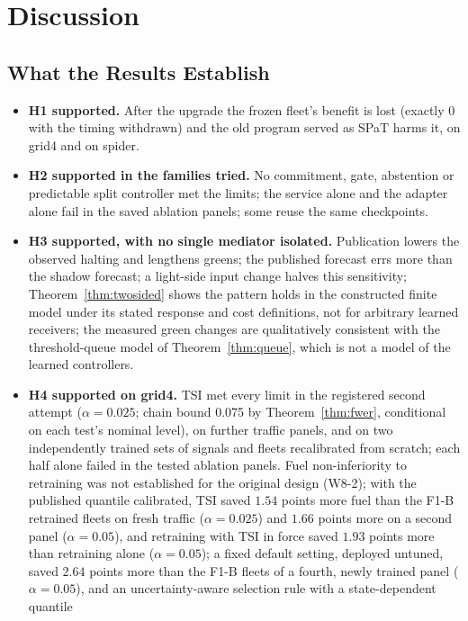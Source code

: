 \section{Discussion}\label{sec:discussion}
\subsection{What the Results Establish}
\begin{itemize}\setlength\itemsep{1pt}
\item \textbf{H1 supported.} After the upgrade the frozen fleet's benefit is lost (exactly 0 with the timing withdrawn) and the old program
served as SPaT harms it, on grid4 and on spider.
\item \textbf{H2 supported in the families tried.} No commitment, gate, abstention or predictable split controller met the limits; the
service alone and the adapter alone fail in the saved ablation panels; some reuse the same checkpoints.
\item \textbf{H3 supported, with no single mediator isolated.} Publication lowers the observed halting and lengthens greens; the published
forecast errs more than the shadow forecast; a light-side input change halves this sensitivity; Theorem~\ref{thm:twosided} shows the
pattern holds in the constructed finite model under its stated response and cost definitions, not for arbitrary learned receivers; the measured green changes are qualitatively consistent with the threshold-queue model of
Theorem~\ref{thm:queue}, which is not a model of the learned controllers.
\item \textbf{H4 supported on grid4.} TSI met every limit in the registered second attempt ($\alpha=0.025$; chain bound 0.075 by
Theorem~\ref{thm:fwer}, conditional on each test's nominal level), on further traffic panels, and on two independently trained sets of
signals and fleets recalibrated from scratch; each half alone failed in the tested ablation panels. Fuel non-inferiority to retraining was
not established for the original design (W8-2); with the published quantile calibrated, TSI saved $1.54$ points more fuel than the F1-B
retrained fleets on fresh traffic ($\alpha=0.025$) and $1.66$ points more on a second panel ($\alpha=0.05$), and retraining with TSI in force
saved $1.93$ points more than retraining alone ($\alpha=0.05$); a fixed default setting, deployed untuned, saved $2.64$ points more than
the F1-B fleets of a fourth, newly trained panel ($\alpha=0.05$), and an uncertainty-aware selection rule with a state-dependent quantile

\end{itemize}
